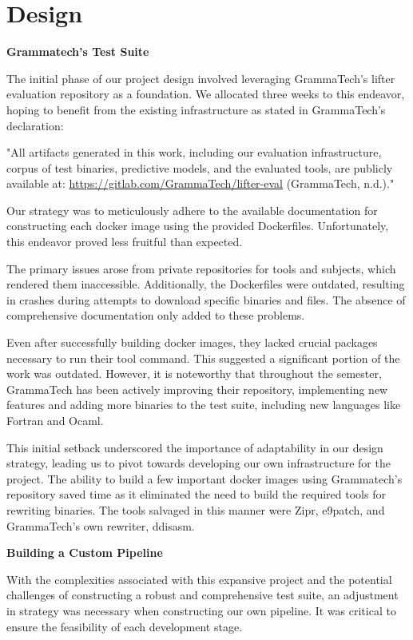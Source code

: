 \documentclass[a4paper,11pt,oneside]{report}
\begin{document}
\chapter{Design}

\setlength{\parindent}{4em}
\textbf{Grammatech’s Test Suite}

The initial phase of our project design involved leveraging GrammaTech's lifter
evaluation repository as a foundation. We allocated three weeks to this endeavor, hoping to
benefit from the existing infrastructure as stated in GrammaTech's declaration:

"All artifacts generated in this work, including our evaluation infrastructure, corpus
of test binaries, predictive models, and the evaluated tools, are publicly available at:
\hyperref[https://gitlab.com/GrammaTech/lifter-eval]{https://gitlab.com/GrammaTech/lifter-eval} (GrammaTech, n.d.)."

Our strategy was to meticulously adhere to the available documentation for
constructing each docker image using the provided Dockerfiles. Unfortunately, this
endeavor proved less fruitful than expected.

The primary issues arose from private repositories for tools and subjects, which
rendered them inaccessible. Additionally, the Dockerfiles were outdated, resulting in
crashes during attempts to download specific binaries and files. The absence of
comprehensive documentation only added to these problems.

Even after successfully building docker images, they lacked crucial packages
necessary to run their tool command. This suggested a significant portion of the work was
outdated. However, it is noteworthy that throughout the semester, GrammaTech has been
actively improving their repository, implementing new features and adding more binaries to
the test suite, including new languages like Fortran and Ocaml.

This initial setback underscored the importance of adaptability in our design
strategy, leading us to pivot towards developing our own infrastructure for the project. The ability to build a few important docker images
using Grammatech’s repository saved time as it eliminated the need to build the required tools for
rewriting binaries. The tools salvaged in this manner were Zipr, e9patch, and
GrammaTech’s own rewriter, ddisasm.

\textbf{Building a Custom Pipeline}

With the complexities associated with this expansive project and the potential
challenges of constructing a robust and comprehensive test suite, an adjustment in
strategy was necessary when constructing our own pipeline. It was critical to ensure the feasibility of each development stage.
\end{document}

